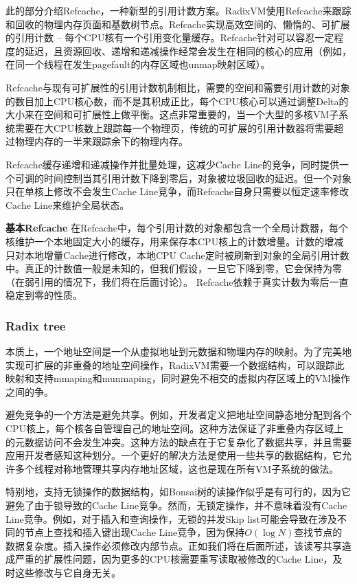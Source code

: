 此的部分介绍Refcache，一种新型的引用计数方案。RadixVM使用Refcache来跟踪和回收的物理内存页面和基数树节点。Refcache实现高效空间的、懒惰的、可扩展的引用计数
--
每个CPU核有一个引用变化量缓存。Refcache针对可以容忍一定程度的延迟，且资源回收、递增和递减操作经常会发生在相同的核心的应用（例如，在同一个线程在发生pagefault的内存区域也unmap映射区域）。

Refcache与现有可扩展性的引用计数机制相比，需要的空间和需要引用计数的对象的数目加上CPU核心数，而不是其积成正比，每个CPU核心可以通过调整Delta的大小来在空间和可扩展性上做平衡。这点非常重要的，当一个大型的多核VM子系统需要在大CPU核数上跟踪每一个物理页，传统的可扩展的引用计数器将需要超过物理内存的一半来跟踪余下的物理内存。

Refcache缓存递增和递减操作并批量处理，这减少Cache
Line的竞争，同时提供一个可调的时间控制当其引用计数下降到零后，对象被垃圾回收的延迟。但一个对象只在单核上修改不会发生Cache
Line竞争，而Refcache自身只需要以恒定速率修改Cache Line来维护全局状态。

\textbf{基本Refcache}
在Refcache中，每个引用计数的对象都包含一个全局计数器，每个核维护一个本地固定大小的缓存，用来保存本CPU核上的计数增量。计数的增减只对本地增量Cache进行修改，本地CPU
Cache定时被刷新到对象的全局引用计数中。真正的计数值一般是未知的，但我们假设，一旦它下降到零，它会保持为零（在弱引用的情况下，我们将在后面讨论）。
Refcache依赖于真实计数为零后一直稳定到零的性质。

\subsubsection{Radix tree}
本质上，一个地址空间是一个从虚拟地址到元数据和物理内存的映射。为了完美地实现可扩展的非重叠的地址空间操作，RadixVM需要一个数据结构，可以跟踪此映射和支持mmaping和munmaping，同时避免不相交的虚拟内存区域上的VM操作之间的争。

避免竞争的一个方法是避免共享。例如，开发者定义把地址空间静态地分配到各个CPU核上，每个核各自管理自己的地址空间。这种方法保证了非重叠内存区域上的元数据访问不会发生冲突。这种方法的缺点在于它复杂化了数据共享，并且需要应用开发者感知这种划分。一个更好的解决方法是使用一些共享的数据结构，它允许多个线程对称地管理共享内存地址区域，这也是现在所有VM子系统的做法。

特别地，支持无锁操作的数据结构，如Bonsai树的读操作似乎是有可行的，因为它避免了由于锁导致的Cache
Line竞争。然而，无锁定操作，并不意味着没有Cache
Line竞争。例如，对于插入和查询操作，无锁的并发Skip
list可能会导致在涉及不同的节点上查找和插入键出现Cache
Line竞争，因为保持$O(\log
N)$查找节点的数据复杂度。插入操作必须修改内部节点。正如我们将在后面所述，该读写共享造成严重的扩展性问题，因为更多的CPU核需要重写读取被修改的Cache
Line，及时这些修改与它自身无关。

